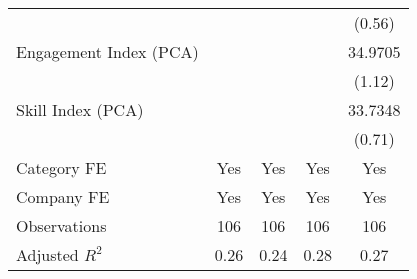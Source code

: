 {\begin{tabular}{l*{4}{c}}
                                   &                   &                   &                   &    (0.56)         \\
[1em]
Engagement Index (PCA)             &                   &                   &                   &   34.9705         \\
                                   &                   &                   &                   &    (1.12)         \\
[1em]
Skill Index (PCA)                  &                   &                   &                   &   33.7348         \\
                                   &                   &                   &                   &    (0.71)         \\
[1em]
Category FE                        &       Yes         &       Yes         &       Yes         &       Yes         \\
[1em]
Company FE                         &       Yes         &       Yes         &       Yes         &       Yes         \\
\hline
Observations                       &       106         &       106         &       106         &       106         \\
Adjusted \(R^{2}\)                 &      0.26         &      0.24         &      0.28         &      0.27         \\
\hline\hline
\end{tabular}
}
